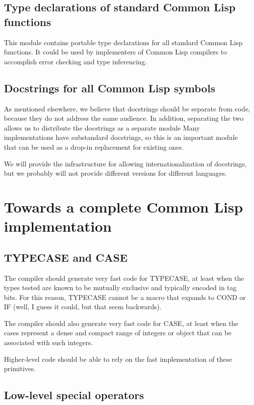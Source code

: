 \documentclass{article}
\begin{document}
\subsection{Type declarations of standard Common Lisp functions}

This module contains portable type declarations for all standard
Common Lisp functions.  It could be used by implementers of Common
Lisp compilers to accomplish error checking and type inferencing. 

\subsection{Docstrings for all Common Lisp symbols}

As mentioned elsewhere, we believe that docstrings should be separate
from code, because they do not address the same audience.  In
addition, separating the two allows us to distribute the docstrings as
a separate module Many implementations have substandard docstrings, so
this is an important module that can be used as a drop-in replacement
for existing ones.

We will provide the infrastructure for allowing internationalization
of docstrings, but we probably will not provide different versions for
different languages. 

\section{Towards a complete Common Lisp implementation}

\subsection{TYPECASE and CASE}

The compiler should generate very fast code for TYPECASE, at least
when the types tested are known to be mutually exclusive and typically
encoded in tag bits.  For this reason, TYPECASE cannot be a macro that
expands to COND or IF (well, I guess it could, but that seem backwards).

The compiler should also generate very fast code for CASE, at least
when the cases represent a dense and compact range of integers or
object that can be associated with such integers.

Higher-level code should be able to rely on the fast implementation of
these primitives. 

\subsection{Low-level special operators}
\end{document}
